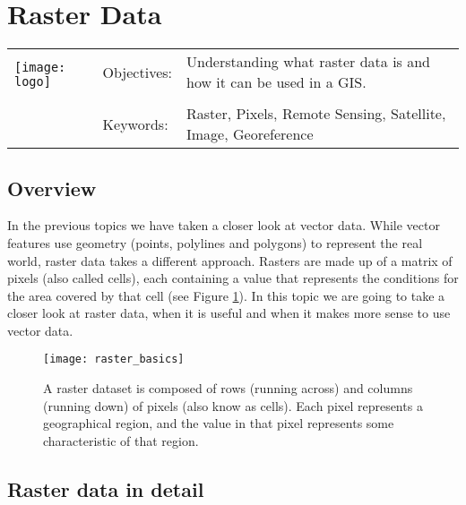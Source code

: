

\section{Raster Data}\label{sec:rasterdata}
\begin{tabular}{p{3.5cm}p{6cm}p{6cm}}
\multirow{2}{*}{\texttt{[image: logo]}} & Objectives: &
Understanding what raster data is and how it can be used in a GIS. \\
& & \\
& Keywords: & 
Raster, Pixels, Remote Sensing, Satellite, Image, Georeference  \\
\hline
\end{tabular}

\subsection{Overview}

In the previous topics we have taken a closer look at vector data. While
vector features use geometry (points, polylines and polygons) to represent
the real world, raster data takes a different approach. Rasters are made up
of a matrix of pixels (also called cells), each containing a value that
represents the conditions  for the area covered by that cell (see
Figure \ref{fig:rastergrid}). In this topic we are going to take a closer
look at raster data, when it is useful and when it makes more sense to use
vector data.

\begin{figure}[ht]
   \begin{center}
   \caption{A raster dataset is composed of rows (running across) and columns
(running down) of pixels (also know as cells). Each pixel represents a
geographical region, and the value in that pixel represents some
characteristic of that region.}
\label{fig:rastergrid}\smallskip
   \texttt{[image: raster\_basics]}
\end{center}
\end{figure}

\subsection{Raster data in detail}

